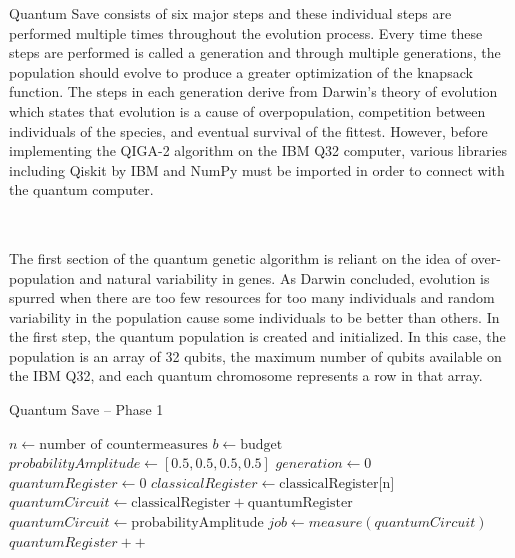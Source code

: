 \vspace{1mm}

Quantum Save consists of six major steps and these individual steps are performed multiple times throughout the evolution process. Every time these steps are performed is called a generation and through multiple generations, the population should evolve to produce a greater optimization of the knapsack function. The steps in each generation derive from Darwin’s theory of evolution which states that evolution is a cause of overpopulation, competition between individuals of the species, and eventual survival of the fittest. However, before implementing the QIGA-2 algorithm on the IBM Q32 computer, various libraries including Qiskit by IBM and NumPy must be imported in order to connect with the quantum computer.

\subsection*{\color{SubSectionBlue}{Phase 1 of Quantum Save}}
 \\

The first section of the quantum genetic algorithm is reliant on the idea of over- population and natural variability in genes. As Darwin concluded, evolution is spurred when there are too few resources for too many individuals and random variability in the population cause some individuals to be better than others. In the first step, the quantum population is created and initialized. In this case, the population is an array of 32 qubits, the maximum number of qubits available on the IBM Q32, and each quantum chromosome represents a row in that array.

\begin{algorithm}
\caption{Quantum Save -- Phase 1}
\begin{algorithmic}[1]
\State $n \gets \text{number of countermeasures}$
\State $b \gets \text{budget}$
\State $probabilityAmplitude \gets [0.5, 0.5, 0.5, 0.5]$
\State $generation \gets 0$
        \State $quantumRegister \gets 0$
            \State $classicalRegister \gets \text{classicalRegister[n]}$
            \State $quantumCircuit \gets \text{classicalRegister} + \text{quantumRegister}$
            \State $quantumCircuit \gets \text{probabilityAmplitude}$
            \State $job \gets measure(quantumCircuit)$
        \EndWhile
        \State $quantumRegister ++$
\EndWhile
\end{algorithmic}
\end{algorithm}

